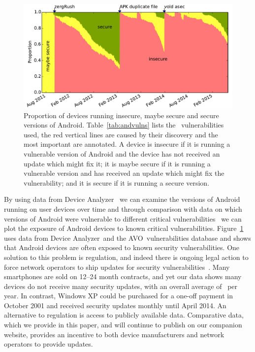 \documentclass{sig-alternate-2013}
\let\OldTodo\todo
\renewcommand{\todo}{\OldTodo[inline]}
\newcommand{\todolater}[1]{}%
\newcommand{\da}{Device Analyzer}
\newcommand{\avo}{AVO}
\begin{document}
\begin{figure}
\centering
\includegraphics[width=\columnwidth]{figures/proportioninsecure}
\caption{Proportion of devices running insecure, maybe secure and secure versions of Android.
Table~\ref{tab:andvulns} lists the \daNumVulnsUsed\ vulnerabilities used, the red vertical lines are caused by their discovery and the most important are annotated.
A device is insecure if it is running a vulnerable version of Android and the device has not received an update which might fix it;
it is maybe secure if it is running a vulnerable version and has received an update which might fix the vulnerability;
and it is secure if it is running a secure version.
}
\label{fig:proportioninsecure}
\end{figure}
By using data from \da~\cite{Wagner2013} we can examine the versions of Android running on user devices over time and through comparison with data on which versions of Android were vulnerable to different critical vulnerabilities~\cite{androidvulnerabilities.org} we can plot the exposure of Android devices to known critical vulnerabilities.
Figure~\ref{fig:proportioninsecure} uses data from \da\ and the \avo\ vulnerabilities database and shows that Android devices are often exposed to known security vulnerabilities.
One solution to this problem is regulation, and indeed there is ongoing legal action to force network operators to ship updates for security vulnerabilities~\cite{Soghoian2013}.\todolater{Check on the status of this legal action}
Many smartphones are sold on 12--24 month contracts, and yet our data shows many devices do not receive many security updates, with an overall average of \daUpdatesPerYearNominal\ per year. 
In contrast, Windows XP could be purchased for a one-off payment in October 2001 and received security updates monthly until April 2014.
An alternative to regulation is access to publicly available data.
Comparative data, which we provide in this paper, and will continue to publish on our companion website, provides an incentive to both device manufacturers and network operators to provide updates.
\end{document}
